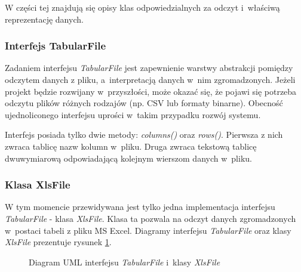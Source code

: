 \documentclass[../thesis.tex]{subfiles}
\begin{document}
W części tej znajdują się opisy klas odpowiedzialnych za odczyt i~właściwą reprezentację danych.

\subsubsection{Interfejs TabularFile}

Zadaniem interfejsu \emph{TabularFile} jest zapewnienie warstwy abstrakcji pomiędzy odczytem danych z pliku, a~interpretacją danych w~nim zgromadzonych. Jeżeli projekt będzie rozwijany w~przyszłości, może okazać się, że pojawi się potrzeba odczytu plików różnych rodzajów (np. CSV lub formaty binarne). Obecność ujednoliconego interfejsu uprości w~takim przypadku rozwój systemu.

Interfejs posiada tylko dwie metody: \emph{columns()} oraz \emph{rows()}. Pierwsza z nich zwraca tablicę nazw kolumn w~pliku. Druga zwraca tekstową tablicę dwuwymiarową odpowiadającą kolejnym wierszom danych w~pliku.

\subsubsection{Klasa XlsFile}

W tym momencie przewidywana jest tylko jedna implementacja interfejsu \emph{TabularFile} - klasa \emph{XlsFile}. Klasa ta pozwala na odczyt danych zgromadzonych w~postaci tabeli z pliku MS Excel. Diagramy interfejsu \emph{TabularFile} oraz klasy \emph{XlsFile} prezentuje rysunek \ref{proj:diagram_xls_file}.

\begin{figure}[h]
\centering
{}
\caption{Diagram UML interfejsu \emph{TabularFile} i~klasy \emph{XlsFile}}
\label{proj:diagram_xls_file}
\end{figure}
\end{document}
